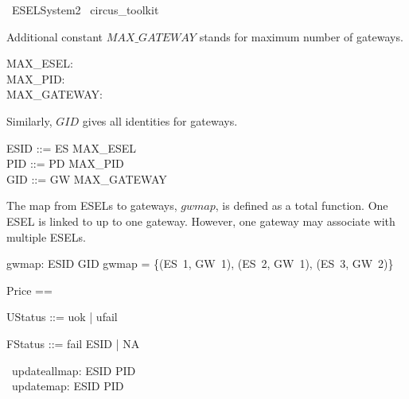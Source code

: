 \begin{zsection}
	\SECTION\ ESELSystem2 \parents\ circus\_toolkit
\end{zsection}

Additional constant $MAX\_GATEWAY$ stands for maximum number of gateways.
\begin{axdef}
    MAX\_ESEL: \nat \\
    MAX\_PID: \nat \\
    MAX\_GATEWAY: \nat
\end{axdef}

Similarly, $GID$ gives all identities for gateways.
\begin{zed}
    ESID ::= ES  \upto MAX\_ESEL \rdata \\
    PID ::= PD  \upto MAX\_PID \rdata \\
    GID ::= GW  \upto MAX\_GATEWAY \rdata 
\end{zed}

The map from ESELs to gateways, $gwmap$, is defined as a total function. One ESEL is linked to up to one gateway. However, one gateway may associate with multiple ESELs.
\begin{axdef}
    gwmap: ESID \fun GID
    \where
    gwmap = \{(ES~1, GW~1), (ES~2, GW~1), (ES~3, GW~2)\}
\end{axdef}

\begin{zed}
    Price == \nat
\end{zed}

\begin{zed}
    UStatus ::= uok | ufail
\end{zed}

\begin{zed}
    FStatus ::= fail \ldata ESID \rdata | NA 
\end{zed}

\begin{circus}
	\circchannel\ updateallmap: ESID \pfun PID \\
	\circchannel\ updatemap: ESID \pfun PID
\end{circus}

